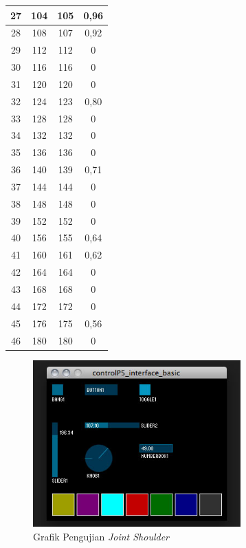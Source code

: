 \begin{table}[!htbp]
\begin{tabular}{|c|c|c|c|}
		27 & 104     & 105      & 0,96 \\ \hline
		28 & 108     & 107      & 0,92 \\ \hline
		29 & 112     & 112      & 0           \\ \hline
		30 & 116     & 116      & 0           \\ \hline
		31 & 120     & 120      & 0           \\ \hline
		32 & 124     & 123      & 0,80 \\ \hline
		33 & 128     & 128      & 0           \\ \hline
		34 & 132     & 132      & 0           \\ \hline
		35 & 136     & 136      & 0           \\ \hline
		36 & 140     & 139      & 0,71 \\ \hline
		37 & 144     & 144      & 0           \\ \hline
		38 & 148     & 148      & 0           \\ \hline
		39 & 152     & 152      & 0           \\ \hline
		40 & 156     & 155      & 0,64 \\ \hline
		41 & 160     & 161      & 0,62      \\ \hline
		42 & 164     & 164      & 0           \\ \hline
		43 & 168     & 168      & 0           \\ \hline
		44 & 172     & 172      & 0           \\ \hline
		45 & 176     & 175      & 0,56 \\ \hline
		46 & 180     & 180      & 0           \\ \hline
	\end{tabular}
\end{table} 
\begin{figure}[H]
	\centering
	\includegraphics[width=8cm]{gambar/controlp5.jpg}
	\caption{Grafik Pengujian \textit{Joint Shoulder}}
	\label{pic.jointshoulder}
\end{figure}

